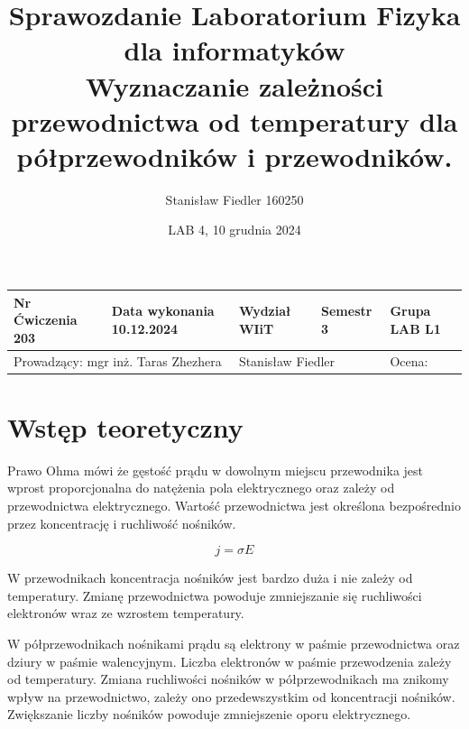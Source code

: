 \documentclass[a4paper, 11pt]{article}
\title{%
        \vspace{-1cm}
       \large Sprawozdanie Laboratorium Fizyka dla informatyków \\
       \huge Wyznaczanie zależności przewodnictwa od temperatury dla półprzewodników i przewodników.}
\author{Stanisław Fiedler 160250}
\date{LAB 4, 10 grudnia 2024}
\begin{document}
\begin{table}
	\begin{adjustwidth}{-0.25\textwidth}{-0.25\textwidth}
		\begin{center}
			\begin{tabular}{|l|l|l|l|l|}
				\hline
				Nr Ćwiczenia 203                                             & Data wykonania 10.12.2024                 & Wydział WIiT & Semestr 3 & Grupa LAB L1 \\
				\hline
				\multicolumn{2}{|l|}{ Prowadzący: mgr inż. Taras Zhezhera  } & \multicolumn{2}{|l|}{ Stanisław Fiedler } & Ocena:                                  \\
				\hline
			\end{tabular}
		\end{center}
	\end{adjustwidth}
\end{table}

\maketitle
\tableofcontents

\section{Wstęp teoretyczny}\label{sec:wstep} %

Prawo Ohma mówi że gęstość prądu w dowolnym miejscu przewodnika jest wprost proporcjonalna do natężenia pola elektrycznego oraz zależy od przewodnictwa elektrycznego.
Wartość przewodnictwa jest określona bezpośrednio przez koncentrację i ruchliwość nośników.

\[
	j = \sigma E
\]

W przewodnikach koncentracja nośników jest bardzo duża i nie zależy od temperatury.
Zmianę przewodnictwa powoduje zmniejszanie się ruchliwości elektronów wraz ze wzrostem temperatury.


W półprzewodnikach nośnikami prądu są elektrony w paśmie przewodnictwa oraz dziury w paśmie walencyjnym.
Liczba elektronów w paśmie przewodzenia zależy od temperatury.
Zmiana ruchliwości nośników w półprzewodnikach ma znikomy wpływ na przewodnictwo, zależy ono przedewszystkim od koncentracji nośników.
Zwiększanie liczby nośników powoduje zmniejszenie oporu elektrycznego.


\end{document}
